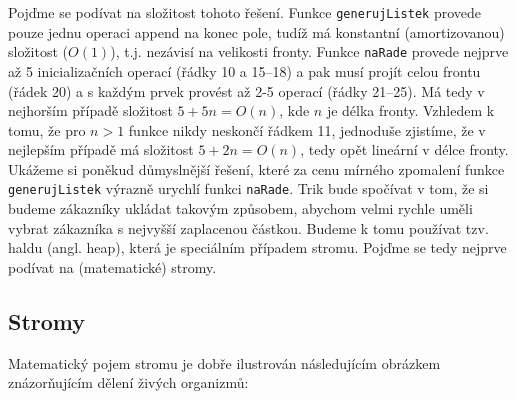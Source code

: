 Pojďme se podívat na složitost tohoto řešení. Funkce {\tt generujListek} provede pouze jednu operaci append na konec pole, tudíž má konstantní (amortizovanou)
složitost ($O(1)$), t.j. nezávisí na velikosti fronty. Funkce {\tt naRade} provede nejprve až 5 inicializačních operací (řádky 10 a 15--18)
a pak musí projít celou frontu (řádek 20) a s každým prvek provést až 2-5 operací (řádky 21--25). Má tedy v nejhorším případě složitost $5 + 5n = O(n)$,
kde $n$ je délka fronty. Vzhledem k tomu, že pro $n>1$ funkce nikdy neskončí řádkem 11, jednoduše zjistíme, že v nejlepším případě má složitost
$5 + 2n = O(n)$, tedy opět lineární v délce fronty. Ukážeme si poněkud důmyslnější řešení, které za cenu mírného zpomalení funkce {\tt generujListek}
výrazně urychlí funkci {\tt naRade}. Trik bude spočívat v tom, že si budeme zákazníky ukládat takovým způsobem, abychom velmi rychle uměli vybrat zákazníka
s nejvyšší zaplacenou částkou. Budeme k tomu používat tzv. haldu (angl. heap), která je speciálním případem stromu.
Pojďme se tedy nejprve podívat na (matematické) stromy.


\subsection*{Stromy}

Matematický pojem stromu je dobře ilustrován následujícím obrázkem znázorňujícím dělení živých organizmů:

\begin{center}
\end{center}


